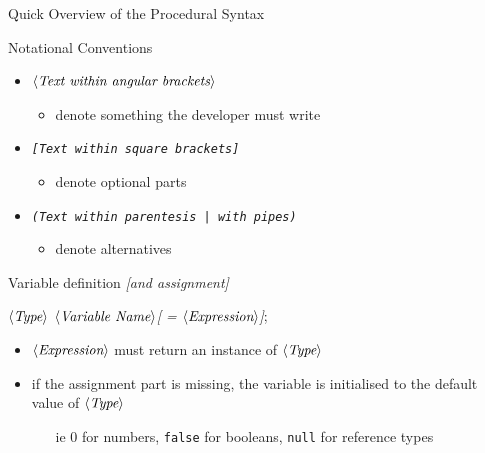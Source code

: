 \documentclass[presentation]{beamer}
\newcommand{\cscat}[1]{$\langle\text{{\itshape#1}}\rangle$}
\newcommand{\csopt}[1]{{\itshape[#1]}}
\newcommand{\csalt}[1]{{\itshape(#1)}}
\begin{document}
\begin{frame}[allowframebreaks]{Quick Overview of the \csharp Procedural Syntax}
    \begin{exampleblock}{Notational Conventions}
        \begin{itemize}
            \item \texttt{\cscat{Text within angular brackets}} 
            \begin{itemize}
                \item denote something the developer must write
            \end{itemize}
            \item \texttt{\csopt{Text within square brackets}} 
            \begin{itemize}
                \item denote optional parts
            \end{itemize}
            \item \texttt{\csalt{Text within parentesis | with pipes}} 
            \begin{itemize}
                \item denote alternatives
            \end{itemize}
         \end{itemize}
    \end{exampleblock}

    \framebreak

    \begin{block}{Variable definition \csopt{and assignment}}
        \begin{center}\ttfamily
            \cscat{Type} \cscat{Variable Name}\csopt{ = \cscat{Expression}};
        \end{center}
        \begin{itemize}
            \item \texttt{\cscat{Expression}} must return an instance of \texttt{\cscat{Type}}
            \item if the assignment part is missing, the variable is initialised to the default value of \texttt{\cscat{Type}}
            \begin{itemize}
                \item[ie] 0 for numbers, \texttt{false} for booleans, \texttt{null} for reference types
            \end{itemize}
        \end{itemize}
    \end{block}


\end{frame}
\end{document}
